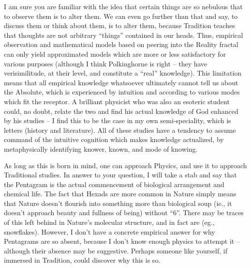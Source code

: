 \begin{footnotesize}
\begin{sffamily}
I am sure you are familiar with the idea that certain things are so nebulous that to observe them is to alter them. We can even go further than that and say, to discuss them or think about them, is to alter them, because Tradition teaches that thoughts are not arbitrary ``things'' contained in our heads. Thus, empirical observation and mathematical models based on peering into the Reality fractal can only yield approximated models which are more or less satisfactory for various purposes (although I think Polkinghorne is right -- they have verisimilitude, at their level, and constitute a ``real'' knowledge). This limitation means that all empirical knowledge whatsoever ultimately cannot tell us about the Absolute, which is experienced by intuition and according to various modes which fit the receptor. A brilliant physicist who was also an esoteric student could, no doubt, relate the two and find his actual knowledge of God enhanced by his studies -- I find this to be the case in my own semi-speciality, which is letters (history and literature). All of these studies have a tendency to assume command of the intuitive cognition which makes knowledge actualized, by metaphysically identifying knower, known, and mode of knowing.

As long as this is born in mind, one can approach Physics, and use it to approach Traditional studies. In answer to your question, I will take a stab and say that the Pentagram is the actual commencement of biological arrangement and chemical life. The fact that Hexads are more common in Nature simply means that Nature doesn't flourish into something more than biological soup (ie., it doesn't approach beauty and fullness of being) without ``6''. There may be traces of this left behind in Nature's molecular structure, and in fact are (eg., snowflakes). However, I don't have a concrete empirical answer for why Pentagrams are so absent, because I don't know enough physics to attempt it -- although their absence may be suggestive. Perhaps someone like yourself, if immersed in Tradition, could discover why this is so.


\hfill

\end{sffamily}
\end{footnotesize}

